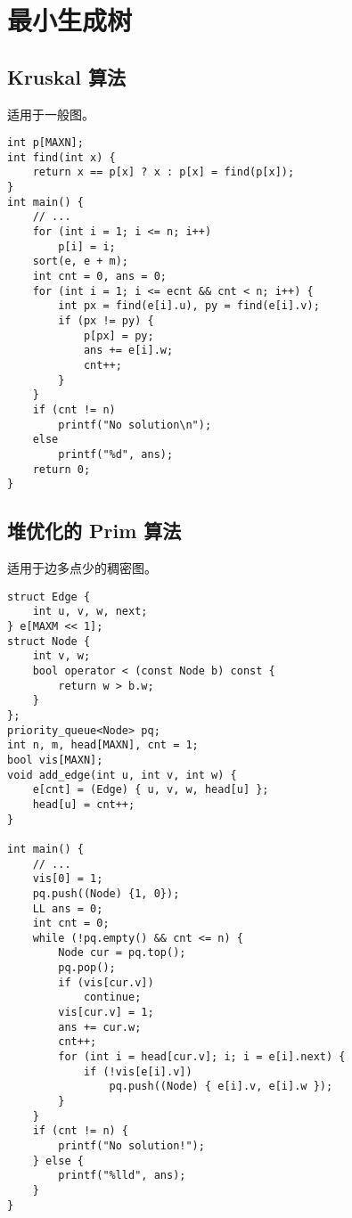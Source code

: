 \section{最小生成树}
\subsection{Kruskal 算法}
适用于一般图。
\begin{verbatim}
int p[MAXN];
int find(int x) {
    return x == p[x] ? x : p[x] = find(p[x]);
}
int main() {
    // ...
    for (int i = 1; i <= n; i++)
        p[i] = i;
    sort(e, e + m);
    int cnt = 0, ans = 0;
    for (int i = 1; i <= ecnt && cnt < n; i++) {
        int px = find(e[i].u), py = find(e[i].v);
        if (px != py) {
            p[px] = py;
            ans += e[i].w;
            cnt++;
        }
    }
    if (cnt != n)
        printf("No solution\n");
    else
        printf("%d", ans);
    return 0;
}

\end{verbatim}

\clearpage

\subsection{堆优化的 Prim 算法}
适用于边多点少的稠密图。
\begin{verbatim}
struct Edge {
    int u, v, w, next;
} e[MAXM << 1];
struct Node {
    int v, w;
    bool operator < (const Node b) const {
        return w > b.w;
    }
};
priority_queue<Node> pq;
int n, m, head[MAXN], cnt = 1;
bool vis[MAXN];
void add_edge(int u, int v, int w) {
    e[cnt] = (Edge) { u, v, w, head[u] };
    head[u] = cnt++;
}

int main() {
    // ...
    vis[0] = 1;
    pq.push((Node) {1, 0});
    LL ans = 0;
    int cnt = 0;
    while (!pq.empty() && cnt <= n) {
        Node cur = pq.top();
        pq.pop();
        if (vis[cur.v])
            continue;
        vis[cur.v] = 1;
        ans += cur.w;
        cnt++;
        for (int i = head[cur.v]; i; i = e[i].next) {
            if (!vis[e[i].v])
                pq.push((Node) { e[i].v, e[i].w });
        }
    } 
    if (cnt != n) {
        printf("No solution!");
    } else {
        printf("%lld", ans);
    }
}
\end{verbatim}
\clearpage